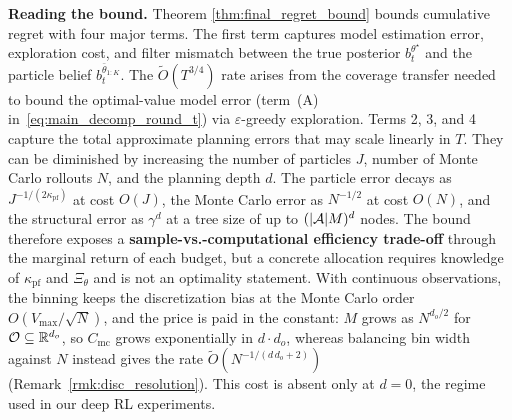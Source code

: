
\textbf{Reading the bound.} Theorem \ref{thm:final_regret_bound} bounds cumulative regret with four major terms. The first term captures model estimation error, exploration cost, and filter mismatch between the true posterior $b_t^{\theta^{\star}}$ and the particle belief $b_t^{\bar\theta_{1:K}}$. The $\widetilde O(T^{3/4})$ rate arises from the coverage transfer needed to bound the optimal-value model error (term~(A) in~\eqref{eq:main_decomp_round_t}) via $\varepsilon$-greedy exploration. Terms 2, 3, and 4 capture the total approximate planning errors that may scale linearly in $T$. They can be diminished by increasing the number of particles $J$, number of Monte Carlo rollouts $N$, and the planning depth $d$.
The particle error decays as $J^{-1/(2\kappa_{\mathrm{pf}})}$ at cost $O(J)$, the Monte Carlo error as $N^{-1/2}$ at cost $O(N)$, and the structural error as $\gamma^{d}$ at a tree size of up to $(|{\mathcal{A}}|M)^{d}$ nodes.
The bound therefore exposes a \textbf{sample-vs.-computational efficiency trade-off} through the marginal return of each budget, but a concrete allocation requires knowledge of $\kappa_{\mathrm{pf}}$ and $\Xi_\theta$ and is not an optimality statement.
With continuous observations, the binning keeps the discretization bias at the Monte Carlo order $O(V_{\max}/\sqrt N)$, and the price is paid in the constant: $M$ grows as $N^{d_o/2}$ for ${\mathcal{O}}\subseteq{\mathbb{R}}^{d_o}$, so $C_{\mathrm{mc}}$ grows exponentially in $d\cdot d_o$, whereas balancing bin width against $N$ instead gives the rate $\widetilde O(N^{-1/(d\,d_o+2)})$ (Remark~\ref{rmk:disc_resolution}).
This cost is absent only at $d=0$, the regime used in our deep RL experiments.

